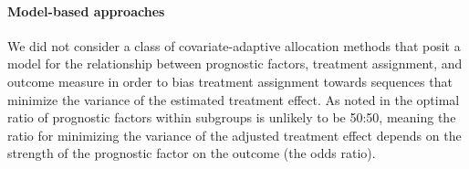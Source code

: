\paragraph{Model-based approaches} We did not consider a class of covariate-adaptive allocation methods that posit a model for the relationship between prognostic factors, treatment assignment, and outcome measure in order to bias treatment assignment towards sequences that minimize the variance of the estimated treatment effect.
As noted in %
the optimal ratio of prognostic factors within subgroups is unlikely to be 50:50, meaning the ratio for minimizing the variance of the adjusted treatment effect depends on the strength of the prognostic factor on the outcome (the odds ratio).

